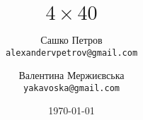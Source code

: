 \documentclass[a4paper,12pt]{book}
\begin{document}
\author{
    Сашко Петров\\
    \texttt{\normalsize alexandervpetrov@gmail.com}
    \and
    Валентина Мержиєвська\\
    \texttt{\normalsize yakavoska@gmail.com}
}
\title{\Huge $4\times40$}
\date{\today}

\frontmatter
\maketitle
\tableofcontents
\mainmatter





\backmatter
\end{document}
